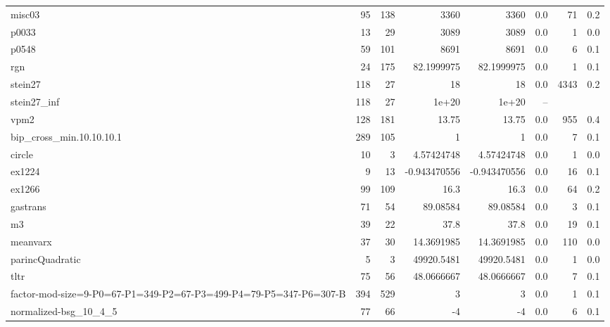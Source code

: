 \documentclass[leqno]{article}
\begin{document}
\begin{center}
\begin{supertabular*}{\textwidth}{@{\extracolsep{\fill}}lrrrrrrr@{}}
misc03             &     95 &    138 &             3360 &             3360 &    0.0 &        71 &      0.2\\
p0033              &     13 &     29 &             3089 &             3089 &    0.0 &         1 &      0.0\\
p0548              &     59 &    101 &             8691 &             8691 &    0.0 &         6 &      0.1\\
rgn                &     24 &    175 &       82.1999975 &       82.1999975 &    0.0 &         1 &      0.1\\
stein27            &    118 &     27 &               18 &               18 &    0.0 &      4343 &      0.2\\
stein27\_inf       &    118 &     27 &            1e+20 &            1e+20 &   --   & &\\
vpm2               &    128 &    181 &            13.75 &            13.75 &    0.0 &       955 &      0.4\\
bip\_cross\_min.10.10.10.1 &    289 &    105 &                1 &                1 &    0.0 &         7 &      0.1\\
circle             &     10 &      3 &       4.57424748 &       4.57424748 &    0.0 &         1 &      0.0\\
ex1224             &      9 &     13 &     -0.943470556 &     -0.943470556 &    0.0 &        16 &      0.1\\
ex1266             &     99 &    109 &             16.3 &             16.3 &    0.0 &        64 &      0.2\\
gastrans           &     71 &     54 &         89.08584 &         89.08584 &    0.0 &         3 &      0.1\\
m3                 &     39 &     22 &             37.8 &             37.8 &    0.0 &        19 &      0.1\\
meanvarx           &     37 &     30 &       14.3691985 &       14.3691985 &    0.0 &       110 &      0.0\\
parincQuadratic    &      5 &      3 &       49920.5481 &       49920.5481 &    0.0 &         1 &      0.0\\
tltr               &     75 &     56 &       48.0666667 &       48.0666667 &    0.0 &         7 &      0.1\\
factor-mod-size=9-P0=67-P1=349-P2=67-P3=499-P4=79-P5=347-P6=307-B &    394 &    529 &                3 &                3 &    0.0 &         1 &      0.1\\
normalized-bsg\_10\_4\_5 &     77 &     66 &               -4 &               -4 &    0.0 &         6 &      0.1\\

\end{supertabular*}
\end{center}
\end{document}
